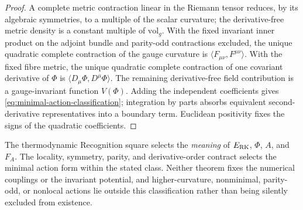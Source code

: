 \begin{proof}
A complete metric contraction linear in the Riemann tensor reduces, by its algebraic symmetries, to a multiple of the scalar curvature; the derivative-free metric density is a constant multiple of $\mathrm{vol}_g$.  With the fixed invariant inner product on the adjoint bundle and parity-odd contractions excluded, the unique quadratic complete contraction of the gauge curvature is $\langle F_{\mu\nu},F^{\mu\nu}\rangle$.  With the fixed fibre metric, the unique quadratic complete contraction of one covariant derivative of $\Phi$ is $\langle D_\mu\Phi,D^\mu\Phi\rangle$.  The remaining derivative-free field contribution is a gauge-invariant function $V(\Phi)$.  Adding the independent coefficients gives \eqref{eq:minimal-action-classification}; integration by parts absorbs equivalent second-derivative representatives into a boundary term.  Euclidean positivity fixes the signs of the quadratic coefficients.
\end{proof}

\begin{remark}
The thermodynamic Recognition square selects the \emph{meaning} of $E_{\mathrm{RK}}$, $\Phi$, $A$, and $F_A$.  The locality, symmetry, parity, and derivative-order contract selects the minimal action form within the stated class.  Neither theorem fixes the numerical couplings or the invariant potential, and higher-curvature, nonminimal, parity-odd, or nonlocal actions lie outside this classification rather than being silently excluded from existence.
\end{remark}
